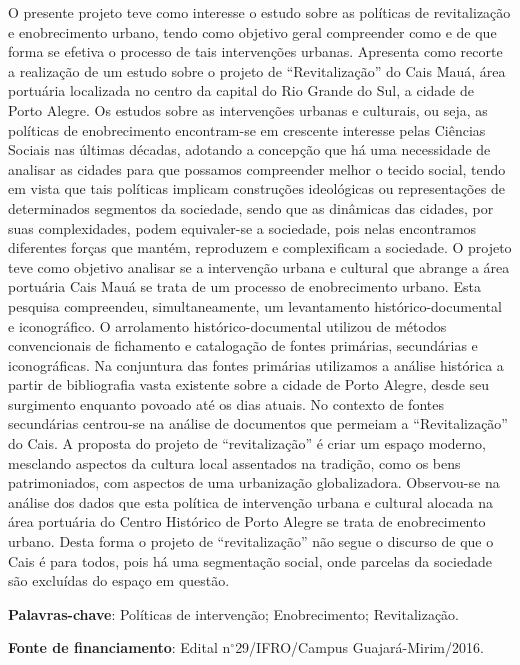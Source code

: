 \documentclass[article,12pt,onesidea,4paper,english,brazil]{abntex2}
\begin{document}
	\noindent O presente projeto teve como interesse o estudo sobre as políticas de revitalização e
	enobrecimento urbano, tendo como objetivo geral compreender como e de que
	forma se efetiva o processo de tais intervenções urbanas. Apresenta como recorte a
	realização de um estudo sobre o projeto de “Revitalização” do Cais Mauá, área
	portuária localizada no centro da capital do Rio Grande do Sul, a cidade de Porto
	Alegre. Os estudos sobre as intervenções urbanas e culturais, ou seja, as políticas
	de enobrecimento encontram-se em crescente interesse pelas Ciências Sociais nas
	últimas décadas, adotando a concepção que há uma necessidade de analisar as
	cidades para que possamos compreender melhor o tecido social, tendo em vista que
	tais políticas implicam construções ideológicas ou representações de determinados
	segmentos da sociedade, sendo que as dinâmicas das cidades, por suas
	complexidades, podem equivaler-se a sociedade, pois nelas encontramos diferentes
	forças que mantém, reproduzem e complexificam a sociedade. O projeto teve como
	objetivo analisar se a intervenção urbana e cultural que abrange a área portuária
	Cais Mauá se trata de um processo de enobrecimento urbano. Esta pesquisa
	compreendeu, simultaneamente, um levantamento histórico-documental e
	iconográfico. O arrolamento histórico-documental utilizou de métodos convencionais
	de fichamento e catalogação de fontes primárias, secundárias e iconográficas. Na
	conjuntura das fontes primárias utilizamos a análise histórica a partir de bibliografia
	vasta existente sobre a cidade de Porto Alegre, desde seu surgimento enquanto
	povoado até os dias atuais. No contexto de fontes secundárias centrou-se na análise
	de documentos que permeiam a “Revitalização” do Cais. A proposta do projeto de
	“revitalização” é criar um espaço moderno, mesclando aspectos da cultura local
	assentados na tradição, como os bens patrimoniados, com aspectos de uma
	urbanização globalizadora. Observou-se na análise dos dados que esta política de
	intervenção urbana e cultural alocada na área portuária do Centro Histórico de Porto
	Alegre se trata de enobrecimento urbano. Desta forma o projeto de “revitalização”
	não segue o discurso de que o Cais é para todos, pois há uma segmentação social,
	onde parcelas da sociedade são excluídas do espaço em questão.
	
	\vspace{\onelineskip}
	
	\noindent
	\textbf{Palavras-chave}: Políticas de intervenção; Enobrecimento; Revitalização.
	
	\noindent
	\textbf{Fonte de financiamento}: Edital n$^{\circ}$29/IFRO/Campus Guajará-Mirim/2016.
	
\end{document}
